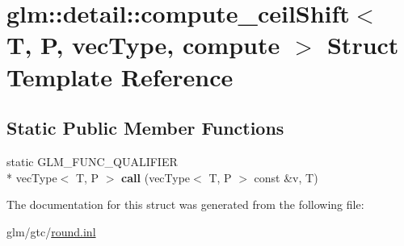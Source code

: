 \hypertarget{structglm_1_1detail_1_1compute__ceilShift}{\section{glm\-:\-:detail\-:\-:compute\-\_\-ceil\-Shift$<$ T, P, vec\-Type, compute $>$ Struct Template Reference}
\label{structglm_1_1detail_1_1compute__ceilShift}
}
\subsection*{Static Public Member Functions}
\begin{DoxyCompactItemize}
\item 
\hypertarget{structglm_1_1detail_1_1compute__ceilShift_a5b16bf873601c2400f4914ad609df30d}{static G\-L\-M\-\_\-\-F\-U\-N\-C\-\_\-\-Q\-U\-A\-L\-I\-F\-I\-E\-R \\*
vec\-Type$<$ T, P $>$ {\bfseries call} (vec\-Type$<$ T, P $>$ const \&v, T)}\label{structglm_1_1detail_1_1compute__ceilShift_a5b16bf873601c2400f4914ad609df30d}

\end{DoxyCompactItemize}


The documentation for this struct was generated from the following file\-:\begin{DoxyCompactItemize}
\item 
glm/gtc/\hyperlink{round_8inl}{round.\-inl}\end{DoxyCompactItemize}
